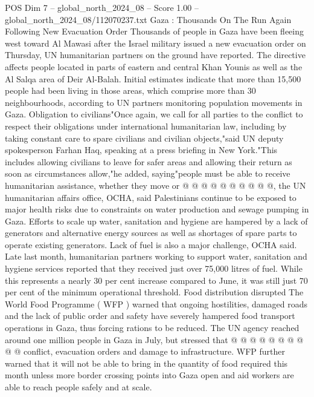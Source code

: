 \begin{textsample}{POS Dim 7 – global\_north\_2024\_08 – Score 1.00 – global\_north\_2024\_08/112070237.txt}  \label{ex:f7_pos_362}
Gaza : Thousands On The Run Again Following New Evacuation Order Thousands of people in Gaza have been fleeing west toward Al Mawasi after the Israel military issued a new evacuation order on Thursday, UN humanitarian partners on the ground have reported.
The directive affects people located in parts of eastern and central Khan Younis as well as the Al Salqa area of Deir Al-Balah.
Initial estimates indicate that more than 15,500 people had been living in those areas, which comprise more than 30 neighbourhoods, according to UN partners monitoring population movements in Gaza.
Obligation to civilians"Once again, we call for all parties to the conflict to respect their obligations under international humanitarian law, including by taking constant care to spare civilians and civilian objects,"said UN deputy spokesperson Farhan Haq, speaking at a press briefing in New York."This includes allowing civilians to leave for safer areas and allowing their return as soon as circumstances allow,"he added, saying"people must be able to receive humanitarian assistance, whether they move or @ @ @ @ @ @ @ @ @ @, the UN humanitarian affairs office, OCHA, said Palestinians continue to be exposed to major health risks due to constraints on water production and sewage pumping in Gaza.
Efforts to scale up water, sanitation and hygiene are hampered by a lack of generators and alternative energy sources as well as shortages of spare parts to operate existing generators.
Lack of fuel is also a major challenge, OCHA said.
Late last month, humanitarian partners working to support water, sanitation and hygiene services reported that they received just over 75,000 litres of fuel.
While this represents a nearly 30 per cent increase compared to June, it was still just 70 per cent of the minimum operational threshold.
Food distribution disrupted The World Food Programme ( WFP ) warned that ongoing hostilities, damaged roads and the lack of public order and safety have severely hampered food transport operations in Gaza, thus forcing rations to be reduced.
The UN agency reached around one million people in Gaza in July, but stressed that @ @ @ @ @ @ @ @ @ @ conflict, evacuation orders and damage to infrastructure.
WFP further warned that it will not be able to bring in the quantity of food required this month unless more border crossing points into Gaza open and aid workers are able to reach people safely and at scale.

\end{textsample}
